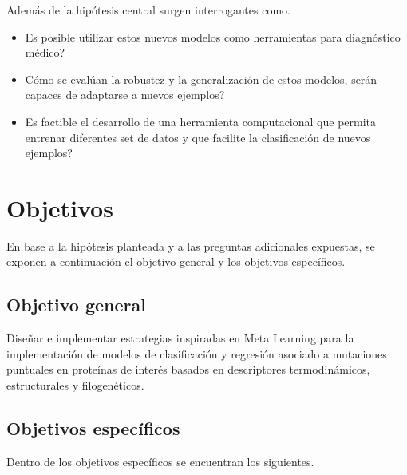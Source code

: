 Además de la hipótesis central surgen interrogantes como.

\begin{itemize}
	
	\item Es posible utilizar estos nuevos modelos como herramientas para diagnóstico médico?
	\item Cómo se evalúan la robustez y la generalización de estos modelos, serán capaces de adaptarse a nuevos ejemplos?
	\item Es factible el desarrollo de una herramienta computacional que permita entrenar diferentes set de datos y que facilite la clasificación de nuevos ejemplos?
	
\end{itemize}

\section{Objetivos}

En base a la hipótesis planteada y a las preguntas adicionales expuestas, se exponen a continuación el objetivo general y los objetivos específicos.

\subsection{Objetivo general}

Diseñar e implementar estrategias inspiradas en Meta Learning para la implementación de modelos de clasificación y regresión asociado a mutaciones puntuales en proteínas de interés basados en descriptores termodinámicos, estructurales y filogenéticos.

\subsection{Objetivos específicos}

Dentro de los objetivos específicos se encuentran los siguientes.

